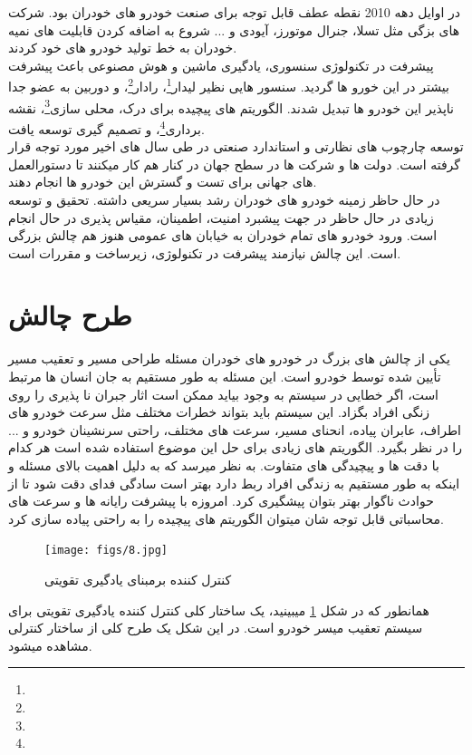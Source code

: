 \documentclass[12pt,a4paper]{report}
\begin{document}
	در اوایل دهه 2010 نقطه عطف قابل توجه برای صنعت خودرو های خودران بود. شرکت های بزگی مثل تسلا، جنرال موتورز، آیودی و ...  شروع به اضافه کردن قابلیت های نمیه خودران به خط تولید خودرو های خود کردند.\\
	پیشرفت در تکنولوژی سنسوری، یادگیری ماشین و هوش مصنوعی باعث پیشرفت بیشتر در این خورو ها گردید. سنسور هایی نظیر لیدار\footnote{}، رادار\footnote{}، و دوربین به عضو جدا ناپذیر این خودرو ها تبدیل شدند. الگوریتم های پیچیده برای درک، محلی سازی\footnote{}، نقشه برداری\footnote{}، و تصمیم گیری توسعه یافت.\\
	توسعه چارچوب های نظارتی و استاندارد صنعتی در طی سال های اخیر مورد توجه قرار گرفته است. دولت ها و شرکت ها در سطح جهان در کنار هم کار میکنند تا دستورالعمل های جهانی برای تست و گسترش این خودرو ها انجام دهند.\\
	در حال حاظر زمینه خودرو های خودران رشد بسیار سریعی داشته. تحقیق و توسعه زیادی در حال حاظر در جهت پیشبرد امنیت، اطمینان، مقیاس پذیری در حال انجام است. ورود خودرو های تمام خودران به خیابان های عمومی هنوز هم چالش بزرگی است. این چالش نیازمند پیشرفت در تکنولوژی، زیرساخت و مقررات است.
	\section{طرح چالش}
	یکی از چالش های بزرگ در خودرو های خودران مسئله طراحی مسیر و تعقیب مسیر تأیین شده توسط خودرو است. این مسئله به طور مستقیم به جان انسان ها مرتبط است، اگر خطایی در سیستم به وجود بیاید ممکن است اثار جبران نا پذیری را روی زنگی افراد بگزاد. این سیستم باید بتواند خطرات مختلف مثل سرعت خودرو های اطراف، عابران پیاده، انحنای مسیر، سرعت های مختلف، راحتی سرنشینان خودرو و ...   را در نظر بگیرد. الگوریتم های زیادی برای حل این موضوع استفاده شده است هر کدام با دقت ها و پیچیدگی های متفاوت. به نظر میرسد که به دلیل اهمیت بالای مسئله و اینکه به طور مستقیم به زندگی افراد ربط دارد بهتر است سادگی فدای دقت شود تا از حوادث ناگوار بهتر بتوان پیشگیری کرد. امروزه با پیشرفت رایانه ها و سرعت های محاسباتی قابل توجه شان میتوان الگوریتم های پیچیده را به راحتی پیاده سازی کرد. \\
	\begin{figure}
		\centering
		\texttt{[image: figs/8.jpg]}
		\caption{ کنترل کننده برمبنای یادگیری تقویتی}
		\label{fig:intro}
	\end{figure}
	همانطور که در شکل \ref{fig:intro} میبینید، یک ساختار کلی کنترل کننده یادگیری تقویتی برای سیستم تعقیب میسر خودرو است. در این شکل یک طرح کلی از ساختار کنترلی مشاهده میشود.
\end{document}
